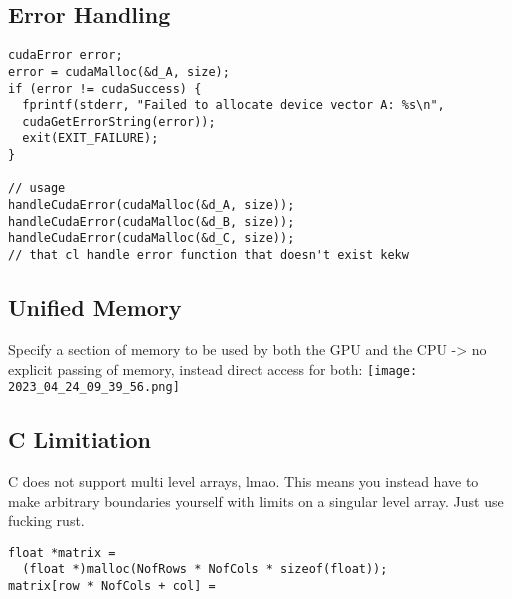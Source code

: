 \documentclass[main.tex,fontsize=8pt,paper=a4,paper=portrait,DIV=calc,]{scrartcl}
\begin{document}
\subsection{Error Handling}
\begin{lstlisting}
cudaError error;
error = cudaMalloc(&d_A, size);
if (error != cudaSuccess) {
  fprintf(stderr, "Failed to allocate device vector A: %s\n",
  cudaGetErrorString(error));
  exit(EXIT_FAILURE);
}

// usage 
handleCudaError(cudaMalloc(&d_A, size));
handleCudaError(cudaMalloc(&d_B, size));
handleCudaError(cudaMalloc(&d_C, size));
// that cl handle error function that doesn't exist kekw
\end{lstlisting}

\subsection{Unified Memory}
Specify a section of memory to be used by both the GPU and the CPU -> no explicit passing of memory, instead direct access for both:\newline
\texttt{[image: 2023\_04\_24\_09\_39\_56.png]}

\subsection{C Limitiation}
C does not support multi level arrays, lmao. This means you instead have to make arbitrary boundaries yourself with limits on a singular level array.\newline
Just use fucking rust.
\begin{lstlisting}
float *matrix =
  (float *)malloc(NofRows * NofCols * sizeof(float));
matrix[row * NofCols + col] =
\end{lstlisting}


\end{document}
